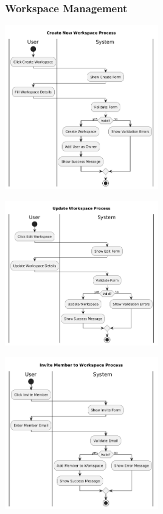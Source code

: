 \subsubsection*{Workspace Management}
\begin{center}
    \includegraphics[width=0.5\textwidth]{assets/activity_diagrams/workspace_create.png}
\end{center}

\begin{center}
    \includegraphics[width=0.5\textwidth]{assets/activity_diagrams/workspace_update.png}
\end{center}

\begin{center}
    \includegraphics[width=0.5\textwidth]{assets/activity_diagrams/workspace_invite.png}
\end{center}

